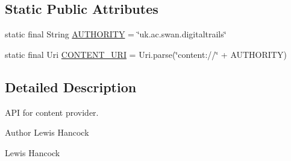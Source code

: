 \subsection*{Static Public Attributes}
\begin{DoxyCompactItemize}
\item 
static final String \hyperlink{classuk_1_1ac_1_1swan_1_1digitaltrails_1_1database_1_1_white_rock_contract_a94bf16e0a89f76da95bb2ffe76bafeea}{A\+U\+T\+H\+O\+R\+I\+T\+Y} = \char`\"{}uk.\+ac.\+swan.\+digitaltrails\char`\"{}
\item 
static final Uri \hyperlink{classuk_1_1ac_1_1swan_1_1digitaltrails_1_1database_1_1_white_rock_contract_abfe96759bfe16773a98099536eef2306}{C\+O\+N\+T\+E\+N\+T\+\_\+\+U\+R\+I} = Uri.\+parse(\char`\"{}content\+://\char`\"{} + A\+U\+T\+H\+O\+R\+I\+T\+Y)
\end{DoxyCompactItemize}


\subsection{Detailed Description}
A\+P\+I for content provider. 

\begin{DoxyAuthor}{Author}
Lewis Hancock 

Lewis Hancock 
\end{DoxyAuthor}



